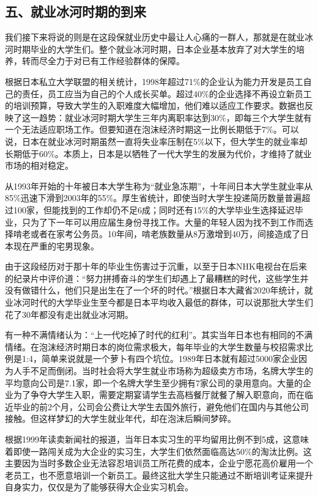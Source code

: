 \subsection{五、就业冰河时期的到来}

我们接下来将说的则是在这段保就业历史中最让人心痛的一群人，那就是在就业冰河时期毕业的大学生们。整个就业冰河时期，日本企业基本放弃了对大学生的培养，转而尽全力于对已有工作经验群体的保障。

根据日本私立大学联盟的相关统计，1998年超过71\%的企业认为能力开发是员工自己的责任，员工应当为自己的个人成长买单。超过40\%的企业选择不再设立新员工的培训预算，导致大学生的入职难度大幅增加，他们难以适应工作要求。数据也反映了这一趋势：就业冰河时期大学生三年内离职率达到30\%，即每三个大学生就有一个无法适应职场工作。但要知道在泡沫经济时期这一比例长期低于7\%。可以说，日本在就业冰河时期虽然一直将失业率压制在5\%以下，但大学生的就业率却长期低于60\%。本质上，日本是以牺牲了一代大学生的发展为代价，才维持了就业市场的相对稳定。

从1993年开始的十年被日本大学生称为“就业急冻期”，十年间日本大学生就业率从85\%迅速下滑到2003年的55\%。厚生省统计，即使当时大学生投递简历数量普遍超过100家，但能找到的工作却仍不足6成；同时还有15\%的大学毕业生选择延迟毕业，只为了下一年可以用应届生身份寻找工作。大量的年轻人因为找不到工作而选择啃老或者在家考公务员。10年间，啃老族数量从8万激增到40万，间接造成了日本现在严重的宅男现象。

由于这段经历对于那十年的毕业生伤害过于沉重，以至于日本NHK电视台在后来的纪录片中评价道：“努力拼搏奋斗的学生们却遇上了最糟糕的时代，这些学生并没有做错什么，他们只是出生在了一个坏的时代。”根据日本大藏省2020年统计，就业冰河时代的大学毕业生至今都是日本平均收入最低的群体，可以说那批大学生们花了30年都没有走出就业冰河期。

有一种不满情绪认为：“上一代吃掉了时代的红利”。其实当年日本也有相同的不满情绪。在泡沫经济时期日本的岗位需求极大，每年毕业的大学生数量与校招需求比例是1:4，简单来说就是一个萝卜有四个坑位。1989年日本就有超过5000家企业因为人手不足而倒闭。当时社会将大学生就业市场称为超级卖方市场，名牌大学生的平均意向公司是7.1家，即一个名牌大学生至少拥有7家公司的录用意向。大量的企业为了争夺大学生入职，需要定期宴请学生去高档餐厅就餐了解入职意向，而在临近毕业的前2个月，公司会公费让大学生去国外旅行，避免他们在国内与其他公司接触。但这样梦幻的大学生就业年代，却在泡沫后瞬间梦碎。

根据1999年读卖新闻社的报道，当年日本实习生的平均留用比例不到5成，这意味着即使一路闯关成为大企业的实习生，大学生们依然面临高达50\%的淘汰比例。这主要因为当时多数企业无法容忍培训员工所花费的成本，企业宁愿花高价雇用一个老员工，也不愿意培训一个新员工。最终这批大学生只能通过不断培训考证来提升自身实力，仅仅是为了能够获得大企业实习机会。


